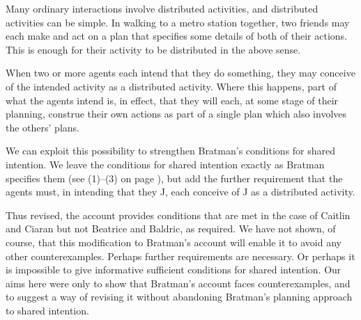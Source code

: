 \documentclass[12pt,\papersize]{extarticle}
\begin{document}
Many ordinary interactions involve distributed activities, and distributed activities can be simple.
In walking to a metro station together,
two friends may each make and act on a plan that specifies some details of both of their actions.
This is enough for their activity to be distributed in the above sense.

When two or more agents each intend that they do something, 
they may conceive of the intended activity as a distributed activity.
Where this happens, part of what the agents intend is, in effect, that they will each, at some stage of their planning, construe their own actions as part of a single plan which also involves the others' plans.

We can exploit this possibility %
to strengthen Bratman's conditions for shared intention.
We leave the conditions for shared intention exactly as Bratman specifies them (see (1)--(3) on page \pageref{quote:bratman_account}),
but add the further requirement that the agents must, in intending that they J, each conceive of J as a distributed activity.

Thus revised, the account provides conditions that are met in the case of Caitlin and Ciaran but not Beatrice and Baldric, as required.
We have not shown, of course, that this modification to Bratman's account will enable it to avoid any other counterexamples.
Perhaps further requirements are necessary.
Or perhaps it is impossible to give informative sufficient conditions for shared intention.
Our aims here were only 
		to show that Bratman's account faces counterexamples,
	and 
		to suggest a way of revising it without abandoning  Bratman's planning approach to shared intention.
		
\end{document}
